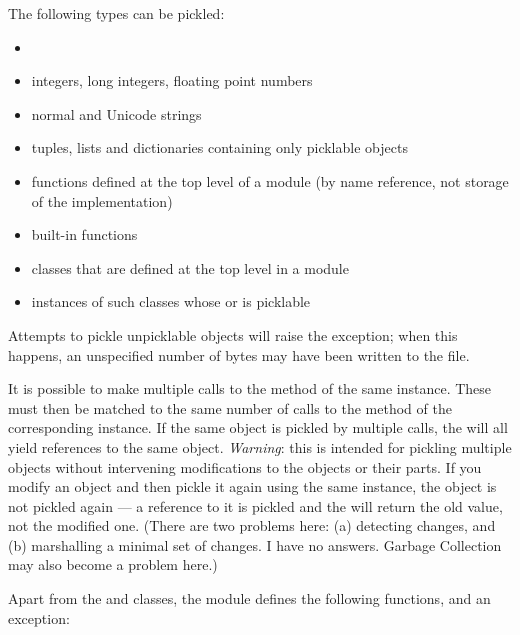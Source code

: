 The following types can be pickled:

\begin{itemize}

\item {}

\item integers, long integers, floating point numbers

\item normal and Unicode strings

\item tuples, lists and dictionaries containing only picklable objects

\item functions defined at the top level of a module (by name
      reference, not storage of the implementation)

\item built-in functions

\item classes that are defined at the top level in a module

\item instances of such classes whose  or
 is picklable

\end{itemize}

Attempts to pickle unpicklable objects will raise the
 exception; when this happens, an unspecified
number of bytes may have been written to the file.

It is possible to make multiple calls to the  method of
the same  instance.  These must then be matched to the
same number of calls to the  method of the
corresponding  instance.  If the same object is
pickled by multiple  calls, the  will all
yield references to the same object.  \emph{Warning}: this is intended
for pickling multiple objects without intervening modifications to the
objects or their parts.  If you modify an object and then pickle it
again using the same  instance, the object is not
pickled again --- a reference to it is pickled and the
 will return the old value, not the modified one.
(There are two problems here: (a) detecting changes, and (b)
marshalling a minimal set of changes.  I have no answers.  Garbage
Collection may also become a problem here.)

Apart from the  and  classes, the
module defines the following functions, and an exception:

